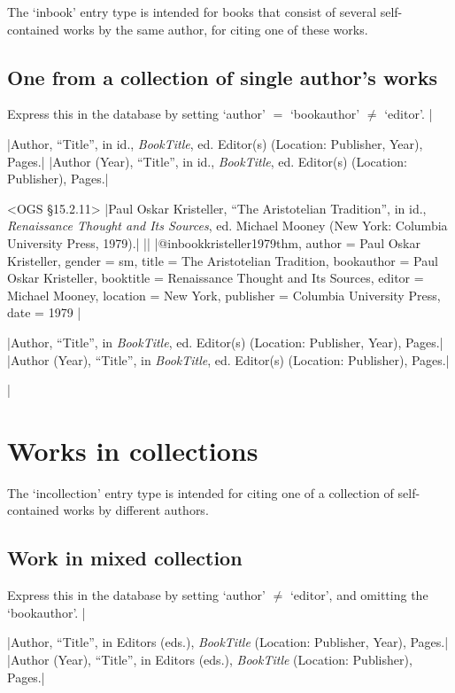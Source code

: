 \documentclass[extrafontsizes,11pt,a4paper,oneside]{memoir}
\newcommand*{\lit}[1]{\textsf{#1}}
\newcommand*{\code}[1]{`\textsf{#1}'}
\begin{document}
The \code{inbook} entry type is intended for books that consist of several self-contained works by the same author, for citing one of these works. 

\subsection{One from a collection of single author's works}

Express this in the database by setting \code{author} $=$ \code{bookauthor} $\neq$ \code{editor}.
|

\specs
|Author, \enquote{Title}, \lit{in id.}, \emph{BookTitle}, \lit{ed.} Editor(s) (Location: Publisher, Year), Pages.|%
|Author (Year), \enquote{Title}, \lit{in id.}, \emph{BookTitle}, \lit{ed.} Editor(s) (Location: Publisher), Pages.|

\bibexample<OGS \S15.2.11>
|Paul Oskar Kristeller, \enquote{The Aristotelian Tradition}, in id., \emph{Renaissance Thought and Its Sources}, ed. Michael Mooney (New York: Columbia University Press, 1979).|%
||%
|@inbook{kristeller1979thm,
  author = {Paul Oskar Kristeller},
  gender = {sm},
  title = {The Aristotelian Tradition},
  bookauthor = {Paul Oskar Kristeller},
  booktitle = {Renaissance Thought and Its Sources},
  editor = {Michael Mooney},
  location = {New York},
  publisher = {Columbia University Press},
  date = {1979}
}|

\specs
|Author, \enquote{Title}, \lit{in} \emph{BookTitle}, \lit{ed.} Editor(s) (Location: Publisher, Year), Pages.|%
|Author (Year), \enquote{Title}, \lit{in} \emph{BookTitle}, \lit{ed.} Editor(s) (Location: Publisher), Pages.|

\todoc|
\section{Works in collections}

The \code{incollection} entry type is intended for citing one of a collection of self-contained works by different authors.

\subsection{Work in mixed collection}

Express this in the database by setting \code{author} $\neq$ \code{editor}, and omitting the \code{bookauthor}.
|

\specs
|Author, \enquote{Title}, \lit{in} Editors (\lit{eds.}), \emph{BookTitle} (Location: Publisher, Year), Pages.|%
|Author (Year), \enquote{Title}, \lit{in} Editors (\lit{eds.}), \emph{BookTitle} (Location: Publisher), Pages.|
\end{document}
